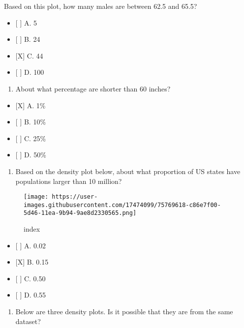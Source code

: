 \documentclass[]{article}
\providecommand{\tightlist}{%
  \setlength{\itemsep}{0pt}\setlength{\parskip}{0pt}}
\begin{document}
Based on this plot, how many males are between 62.5 and 65.5?

\begin{itemize}
\tightlist
\item
  {[} {]} A. 5
\item
  {[} {]} B. 24
\item
  {[}X{]} C. 44
\item
  {[} {]} D. 100
\end{itemize}

\begin{enumerate}
\def\labelenumi{\arabic{enumi}.}
\setcounter{enumi}{7}
\tightlist
\item
  About what percentage are shorter than 60 inches?
\end{enumerate}

\begin{itemize}
\tightlist
\item
  {[}X{]} A. 1\%
\item
  {[} {]} B. 10\%
\item
  {[} {]} C. 25\%
\item
  {[} {]} D. 50\%
\end{itemize}

\begin{enumerate}
\def\labelenumi{\arabic{enumi}.}
\setcounter{enumi}{8}
\tightlist
\item
  Based on the density plot below, about what proportion of US states
  have populations larger than 10 million?
\end{enumerate}

\begin{figure}
\centering
\texttt{[image: https://user-images.githubusercontent.com/17474099/75769618-c86e7f00-5d46-11ea-9b94-9ae8d2330565.png]}
\caption{index}
\end{figure}

\begin{itemize}
\tightlist
\item
  {[} {]} A. 0.02
\item
  {[}X{]} B. 0.15
\item
  {[} {]} C. 0.50
\item
  {[} {]} D. 0.55
\end{itemize}

\begin{enumerate}
\def\labelenumi{\arabic{enumi}.}
\setcounter{enumi}{9}
\tightlist
\item
  Below are three density plots. Is it possible that they are from the
  same dataset?
\end{enumerate}
\end{document}
